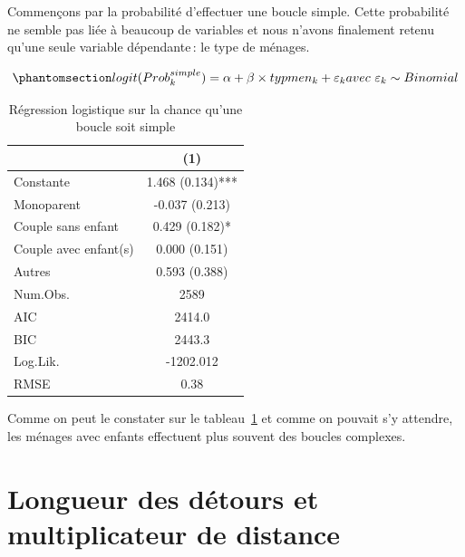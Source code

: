 \documentclass[
  9pt,
  a4paper,
  DIV=11]{scrreprt}
\begin{document}
Commençons par la probabilité d'effectuer une boucle simple. Cette
probabilité ne semble pas liée à beaucoup de variables et nous n'avons
finalement retenu qu'une seule variable dépendante\,: le type de
ménages.

\begin{equation}\phantomsection\label{eq-logit-bcl-simple}{
logit(Prob^{simple}_k) = \alpha + \beta \times typmen_k +\varepsilon_k \\ avec\ \varepsilon_k \sim Binomial
}\end{equation}

\begin{longtable}{lc}

\caption{\label{tbl-logit-simple}Régression logistique sur la chance
qu'une boucle soit simple}

\tabularnewline

\toprule
  & (1) \\ 
\midrule\addlinespace[2.5pt]
Constante & 1.468 (0.134)*** \\ 
Monoparent & -0.037 (0.213) \\ 
Couple sans enfant & 0.429 (0.182)* \\ 
Couple avec enfant(s) & 0.000 (0.151) \\ 
Autres & 0.593 (0.388) \\ 
Num.Obs. & 2589 \\ 
AIC & 2414.0 \\ 
BIC & 2443.3 \\ 
Log.Lik. & -1202.012 \\ 
RMSE & 0.38 \\ 
\bottomrule

\end{longtable}

Comme on peut le constater sur le tableau~\ref{tbl-logit-simple} et
comme on pouvait s'y attendre, les ménages avec enfants effectuent plus
souvent des boucles complexes.

\section{Longueur des détours et multiplicateur de
distance}\label{longueur-des-duxe9tours-et-multiplicateur-de-distance}
\end{document}
